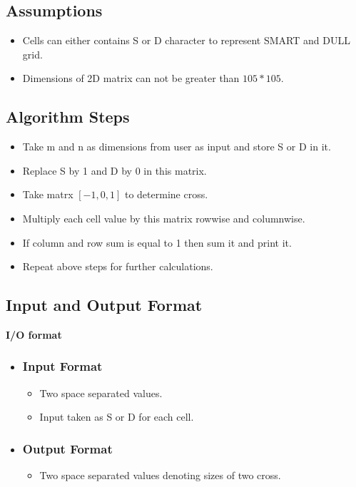\documentclass[11pt]{article}
\begin{document}
\subsection{Assumptions}
{
\begin{itemize}
\item Cells can either contains S or D character to represent SMART and DULL grid.
\item Dimensions of 2D matrix can not be greater than $105*105$.
\end{itemize}
}




\subsection{Algorithm Steps}
{
\begin{itemize}
\item Take m and n as dimensions from user as input and store S or D in it.
\item Replace S by 1 and D by 0 in this matrix.
\item Take matrx $[-1,0,1]$ to determine cross.
\item Multiply each cell value by this matrix rowwise and columnwise.
\item If column and row sum is equal to 1 then sum it and print it.
\item Repeat above steps for further calculations. 
\end{itemize}





\subsection{Input and Output Format}
{


\textbf{I/O format} 
\begin{itemize}
\item \subsubsection{Input Format}
\begin{itemize}
\item Two space separated values.
\item Input taken as S or D for each cell.
\end{itemize}

\item \subsubsection{Output Format}
\begin{itemize}
\item Two space separated values denoting sizes of two cross.
\end{itemize}
\end{itemize}


}}
\end{document}
